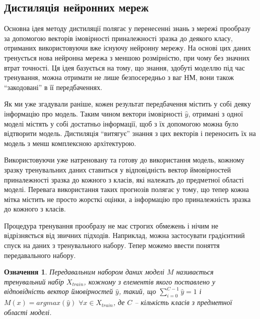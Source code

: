 \documentclass[14pt,a4paper]{extarticle}
\newcounter{e}
\newtheorem{defn}[theorem]{Означення}
\numberwithin{equation}{section}
\numberwithin{figure}{section}
\begin{document}
 \subsection{Дистиляція нейронних мереж}
 
 Основна ідея методу дистиляції полягає у перенесенні знань з мережі прообразу за допомогою векторів імовірності приналежності зразка до деякого класу, отриманих використовуючи вже існуючу нейронну мережу. На основі цих даних тренується нова нейронна мережа з меншою розмірністю, при чому без значних втрат точності. Ця ідея базується на тому, що знання, здобуті моделлю під час тренування, можна отримати не лише безпосередньо з ваг НМ, вони також ``закодовані'' в її передбаченнях.
 
 Як ми уже згадували раніше, кожен результат передбачення містить у собі деяку інформацію про модель. Таким чином вектори імовірності $\hat{y}$, отримані з одної моделі містять у собі достатньо інформації, щоб з їх допомогою можна було відтворити модель. Дистиляція ``витягує'' знання з цих векторів і переносить їх на модель з менш комплексною архітектурою.
 
 Використовуючи уже натреновану та готову до використання модель, кожному зразку тренувальних даних ставиться у відповідність вектор ймовірностей приналежності зразка до кожного з класів, які належать до предметної області моделі. Перевага використання таких прогнозів полягає у тому, що тепер кожна мітка містить не просто жорсткі оцінки, а інформацію про приналежність зразка до кожного з класів.
 
 
 Процедура тренування прообразу не має строгих обмежень і нічим не відрізняється від звичних підходів. Наприклад, можна застосувати градієнтний спуск на даних з тренувального набору. Тепер можемо ввести поняття передавального набору.
 
 \begin{defn}
 	Передавальним набором даних моделі $M$ називається тренувальний набір $X_{train}$, кожному з елементів якого поставлено у відповідність вектор ймовірностей $\hat{y}$, такий, що $\sum\limits^{C-1}_{i=0}\hat{y} = 1$ і $M(x)=argmax(\hat{y})$ $ \forall x \in X_{train}$, де $C$ -- кількість класів з предметної області моделі.
 \end{defn}
 
\end{document}
